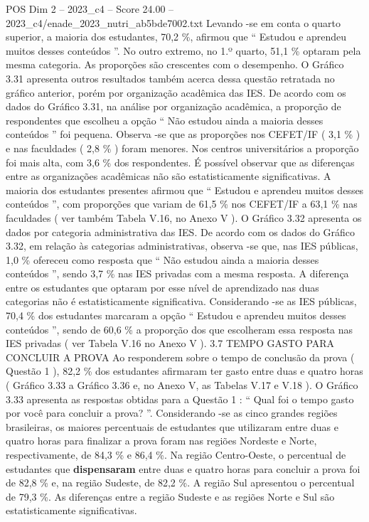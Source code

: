\begin{textsample}{POS Dim 2 – 2023\_c4 – Score 24.00 – 2023\_c4/enade\_2023\_nutri\_ab5bde7002.txt}
Levando -se em conta o quarto superior, a maioria dos estudantes, 70,2 \%, afirmou que “ Estudou e aprendeu muitos desses conteúdos ”.
No outro extremo, no 1.º quarto, 51,1 \% optaram pela mesma categoria.
As proporções são crescentes com o desempenho.
O Gráfico 3.31 apresenta outros resultados também acerca dessa questão retratada no gráfico anterior, porém por organização acadêmica das IES.
De acordo com os dados do Gráfico 3.31, na análise por organização acadêmica, a proporção de respondentes que escolheu a opção “ Não estudou ainda a maioria desses conteúdos ” foi pequena.
Observa -se que as proporções nos CEFET/IF ( 3,1 \% ) e nas faculdades ( 2,8 \% ) foram menores.
Nos centros universitários a proporção foi mais alta, com 3,6 \% dos respondentes.
É possível observar que as diferenças entre as organizações acadêmicas não são estatisticamente significativas.
A maioria dos estudantes presentes afirmou que “ Estudou e aprendeu muitos desses conteúdos ”, com proporções que variam de 61,5 \% nos CEFET/IF a 63,1 \% nas faculdades ( ver também Tabela V.16, no Anexo V ).
O Gráfico 3.32 apresenta os dados por categoria administrativa das IES.
De acordo com os dados do Gráfico 3.32, em relação às categorias administrativas, observa -se que, nas IES públicas, 1,0 \% ofereceu como resposta que “ Não estudou ainda a maioria desses conteúdos ”, sendo 3,7 \% nas IES privadas com a mesma resposta.
A diferença entre os estudantes que optaram por esse nível de aprendizado nas duas categorias não é estatisticamente significativa.
Considerando -se as IES públicas, 70,4 \% dos estudantes marcaram a opção “ Estudou e aprendeu muitos desses conteúdos ”, sendo de 60,6 \% a proporção dos que escolheram essa resposta nas IES privadas ( ver Tabela V.16 no Anexo V ). 3.7 TEMPO GASTO PARA CONCLUIR A PROVA Ao responderem sobre o tempo de conclusão da prova ( Questão 1 ), 82,2 \% dos estudantes afirmaram ter gasto entre duas e quatro horas ( Gráfico 3.33 a Gráfico 3.36 e, no Anexo V, as Tabelas V.17 e V.18 ).
O Gráfico 3.33 apresenta as respostas obtidas para a Questão 1 : “ Qual foi o tempo gasto por você para concluir a prova? ”.
Considerando -se as cinco grandes regiões brasileiras, os maiores percentuais de estudantes que utilizaram entre duas e quatro horas para finalizar a prova foram nas regiões Nordeste e Norte, respectivamente, de 84,3 \% e 86,4 \%.
Na região Centro-Oeste, o percentual de estudantes que \textbf{dispensaram} entre duas e quatro horas para concluir a prova foi de 82,8 \% e, na região Sudeste, de 82,2 \%.
A região Sul apresentou o percentual de 79,3 \%.
As diferenças entre a região Sudeste e as regiões Norte e Sul são estatisticamente significativas.

\end{textsample}
